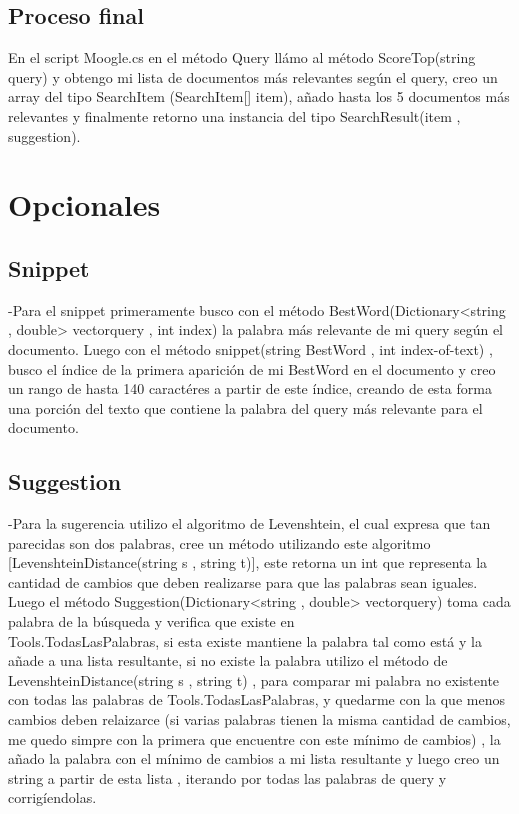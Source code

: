 \documentclass[a4paper,12pt]{article}
\begin{document}
    \subsection{Proceso final}\label{sub:finalprocces}
    En el script Moogle.cs en el método Query llámo al método ScoreTop(string query) y obtengo mi lista de documentos más relevantes según el query, creo un array del tipo SearchItem (SearchItem[] item), añado hasta los 5 documentos más relevantes y finalmente retorno una instancia del tipo SearchResult(item , suggestion).

    \section{Opcionales}\label{sec:Opcionales}
    
    \subsection{Snippet}\label{sub:Explain Snippet}
    -Para el snippet primeramente busco con el método BestWord(Dictionary<string , double> vectorquery , int index) la palabra más relevante de mi query según el documento. Luego con el método snippet(string BestWord , int index-of-text) , busco el índice de la primera aparición de mi BestWord en el documento y creo un rango de hasta 140 caractéres a partir de este índice, creando de esta forma una porción del texto que contiene la palabra del query más relevante para el documento.

    \subsection{Suggestion}\label{sub:Explain Suggestion}
    -Para la sugerencia utilizo el algoritmo de Levenshtein, el cual expresa que tan parecidas son dos palabras, cree un método utilizando
    este algoritmo [LevenshteinDistance(string s , string t)], este retorna un int que representa la cantidad de cambios que deben realizarse para que las palabras sean iguales. Luego el método Suggestion(Dictionary<string , double> vectorquery)
    toma cada palabra de la búsqueda y verifica que existe en \\Tools.TodasLasPalabras, si esta existe mantiene la palabra tal como está y la añade a una lista resultante, si no existe la palabra utilizo el método de LevenshteinDistance(string s , string t)
    , para comparar mi palabra no existente con todas las palabras de Tools.TodasLasPalabras, y quedarme con la que menos cambios deben relaizarce (si varias palabras tienen la misma cantidad de cambios, me quedo simpre con la primera que encuentre con este mínimo de cambios)
    , la añado la palabra con el mínimo
    de cambios a mi lista resultante y luego creo un string a partir de esta lista , iterando por todas las palabras de query y corrigíendolas.
\end{document}
